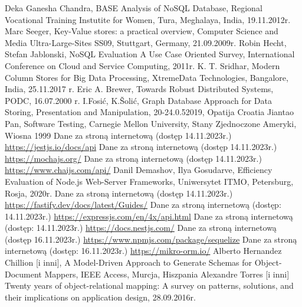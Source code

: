 \documentclass[12pt, a4paper, twoside, openany]{book}
\begin{document}
\begin{thebibliography}{9}
     Deka Ganesha Chandra, BASE Analysis of NoSQL Database, Regional Vocational Training Instutite for Women, Tura, Meghalaya, India, 19.11.2012r.
     Marc Seeger, Key-Value stores: a practical overview, Computer Science and Media Ultra-Large-Sites SS09, Stuttgart, Germany, 21.09.2009r.
     Robin Hecht, Stefan Jablonski, NoSQL Evaluation A Use Case Oriented Survey, International Conference on Cloud and Service Computing, 2011r.
     K. T. Sridhar, Modern Column Stores for Big Data Processing, XtremeData Technologies, Bangalore, India, 25.11.2017 r.
     Eric A. Brewer, Towards Robust Distributed Systems, PODC, 16.07.2000 r.
    I.Fosić, K.Šolić, Graph Database Approach for Data Storing, Presentation and Manipulation, 20-24.0.52019, Opatija Croatia
     Jiantao Pan, Software Testing, Carnegie Mellon University, Stany Zjednoczone Ameryki, Wiosna 1999
     Dane za stroną internetową (dostęp 14.11.2023r.) \url{https://jestjs.io/docs/api}
     Dane za stroną internetową (dostęp 14.11.2023r.) \url{https://mochajs.org/}
     Dane za stroną internetową (dostęp 14.11.2023r.) \url{https://www.chaijs.com/api/}
     Danil Demashov, Ilya Gosudarve, Efficiency Evaluation of Node.js Web-Server Frameworks, Uniwersytet ITMO, Petersburg, Rosja, 2020r.
     Dane za stroną internetową (dostęp 14.11.2023r.) \url{https://fastify.dev/docs/latest/Guides/}
     Dane za stroną internetową (dostęp: 14.11.2023r.) \url{https://expressjs.com/en/4x/api.html}
     Dane za stroną internetową (dostęp: 14.11.2023r.) \url{https://docs.nestjs.com/}
     Dane za stroną internetową (dostęp 16.11.2023r.) \url{https://www.npmjs.com/package/sequelize}
     Dane za stroną internetową (dostęp: 16.11.2023r.) \url{https://mikro-orm.io/}
     Alberto Hernandez Chillion [i inni], A Model-Driven Approach to Generate Schemas for Object-Document Mappers, IEEE Access, Murcja, Hiszpania
     Alexandre Torres [i inni] Twenty years of object-relational mapping: A survey on patterns, solutions, and their implications on application design, 28.09.2016r.

\end{thebibliography}
\end{document}
